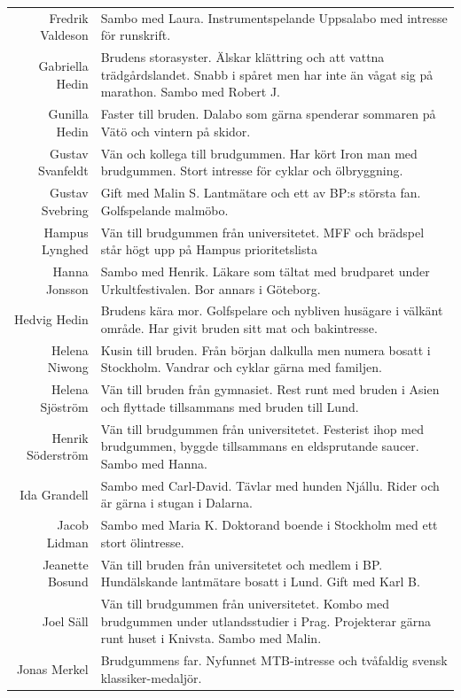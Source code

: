 \documentclass[a5paper]{article}
\begin{document}
\begin{longtable}[l]{N|L}
				Fredrik Valdeson	& Sambo med Laura. Instrumentspelande Uppsalabo med intresse för runskrift.	\\
				Gabriella Hedin	&	Brudens storasyster. Älskar klättring och att vattna trädgårdslandet. Snabb i spåret men har inte än vågat sig på marathon. Sambo med Robert J.	\\
				Gunilla Hedin	    & Faster till bruden. Dalabo som gärna spenderar sommaren på Vätö och vintern på skidor.	\\
				Gustav Svanfeldt	& Vän och kollega till brudgummen. Har kört Iron man med brudgummen. Stort intresse för cyklar och ölbryggning.	\\
				Gustav Svebring	&	Gift med Malin S. Lantmätare och ett av BP:s största fan. Golfspelande malmöbo.	\\
				Hampus Lynghed	&	Vän till brudgummen från universitetet. MFF och brädspel står högt upp på Hampus prioritetslista 	\\
				Hanna Jonsson	&	Sambo med Henrik. Läkare som tältat med brudparet under Urkultfestivalen. Bor annars i Göteborg. 	\\
				Hedvig Hedin	&	Brudens kära mor. Golfspelare och nybliven husägare i välkänt område. Har givit bruden sitt mat och bakintresse.	\\
				Helena Niwong	&	Kusin till bruden. Från början dalkulla men numera bosatt i Stockholm. Vandrar och cyklar gärna med familjen.	\\
				Helena Sjöström	&	Vän till bruden från gymnasiet. Rest runt med bruden i Asien och flyttade tillsammans med  bruden till Lund.	\\
				Henrik Söderström	&	Vän till brudgummen från universitetet. Festerist ihop med brudgummen, byggde tillsammans en eldsprutande saucer. Sambo med Hanna.	\\
				Ida Grandell	&	Sambo med Carl-David. Tävlar med hunden Njállu. Rider och är gärna i stugan i Dalarna.	\\
				Jacob Lidman	&	Sambo med Maria K. Doktorand boende i Stockholm med ett stort ölintresse. 	\\
				Jeanette Bosund	&	Vän till bruden från universitetet och medlem i BP.  Hundälskande lantmätare bosatt i Lund. Gift med Karl B.	\\
				Joel Säll	&	Vän till brudgummen från universitetet. Kombo med brudgummen under utlandsstudier i Prag. Projekterar gärna runt huset i Knivsta. Sambo med Malin.	\\
				Jonas Merkel	&	Brudgummens far. Nyfunnet MTB-intresse och tvåfaldig svensk klassiker-medaljör.	\\

\end{longtable}
\end{document}
